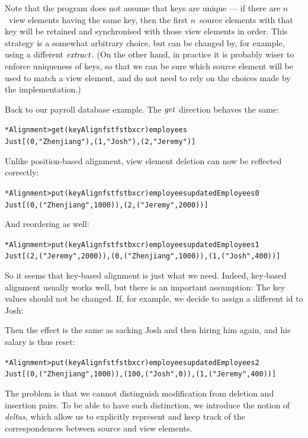 Note that the program does not assume that keys are unique --- if there are $n$~view elements having the same key, then the first $n$~source elements with that key will be retained and synchronised with those view elements in order.
This strategy is a somewhat arbitrary choice, but can be changed by, for example, using a different \ensuremath{\Varid{extract}}.
(On the other hand, in practice it is probably wiser to enforce uniqueness of keys, so that we can be sure which source element will be used to match a view element, and do not need to rely on the choices made by the implementation.)

Back to our payroll database example.
The \ensuremath{\Varid{get}} direction behaves the same:
\begin{alltt}
*Alignment> get (keyAlign fst fst bx cr) employees
Just [(0,"Zhenjiang"),(1,"Josh"),(2,"Jeremy")]
\end{alltt}
Unlike position-based alignment, view element deletion can now be reflected correctly:
\begin{alltt}
*Alignment> put (keyAlign fst fst bx cr) employees updatedEmployees0
Just [(0,("Zhenjiang",1000)),(2,("Jeremy",2000))]
\end{alltt}
And reordering as well:
\begin{alltt}
*Alignment> put (keyAlign fst fst bx cr) employees updatedEmployees1
Just [(2,("Jeremy",2000)),(0,("Zhenjiang",1000)),(1,("Josh",400))]
\end{alltt}

So it seems that key-based alignment is just what we need.
Indeed, key-based alignment usually works well, but there is an important assumption:
The key values should not be changed.
If, for example, we decide to assign a different id to Josh:
\resethooks
Then the effect is the same as sacking Josh and then hiring him again, and his salary is thus reset:
\begin{alltt}
*Alignment> put (keyAlign fst fst bx cr) employees updatedEmployees2
Just [(0,("Zhenjiang",1000)),(100,("Josh",0)),(1,("Jeremy",400))]
\end{alltt}
The problem is that we cannot distinguish modification from deletion and insertion pairs.
To be able to have such distinction, we introduce the notion of \emph{deltas}, which allow us to explicitly represent and keep track of the correspondences between source and view elements.


